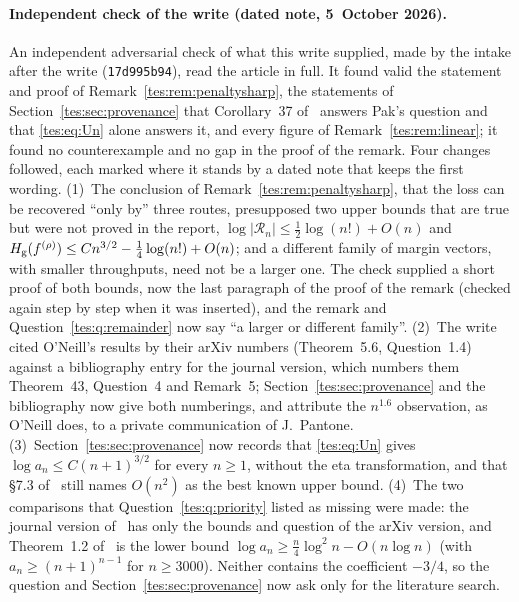 \documentclass[11pt,a4paper]{article}
\theoremstyle{remark}\newtheorem{remark}[theorem]{Remark}
\newcommand{\Hg}{H_{\rm g}}\newcommand{\floor}[1]{\left\lfloor#1\right\rfloor}
\numberwithin{equation}{section}
\begin{document}
\paragraph{Independent check of the write (dated note, 5~October 2026).}
An independent adversarial check of what this write supplied, made by the
intake after the write (\nolinkurl{17d995b94}), read the article in full.
It found valid the statement and proof of
Remark~\ref{tes:rem:penaltysharp}, the statements of
Section~\ref{tes:sec:provenance} that Corollary~37 of~\cite{bbm} answers
Pak's question and that \eqref{tes:eq:Un} alone answers it, and every
figure of Remark~\ref{tes:rem:linear}; it found no counterexample and no
gap in the proof of the remark. Four changes followed, each marked where it
stands by a dated note that keeps the first wording. (1)~The conclusion of
Remark~\ref{tes:rem:penaltysharp}, that the loss can be recovered ``only
by'' three routes, presupposed two upper bounds that are true but were not
proved in the report, $\log|\mathcal R_n|\le\frac12\log(n!)+O(n)$ and
$\Hg(f^{(\rho)})\le Cn^{3/2}-\frac14\log(n!)+O(n)$; and a different family
of margin vectors, with smaller throughputs, need not be a larger one. The
check supplied a short proof of both bounds, now the last paragraph of the
proof of the remark (checked again step by step when it was inserted), and
the remark and Question~\ref{tes:q:remainder} now say ``a larger or
different family''. (2)~The write cited O'Neill's results by their arXiv
numbers (Theorem~5.6, Question~1.4) against a bibliography entry for the
journal version, which numbers them Theorem~43, Question~4 and Remark~5;
Section~\ref{tes:sec:provenance} and the bibliography now give both
numberings, and attribute the $n^{1.6}$ observation, as O'Neill does, to a
private communication of J.~Pantone. (3)~Section~\ref{tes:sec:provenance}
now records that \eqref{tes:eq:Un} gives $\log a_n\le C(n+1)^{3/2}$ for
every $n\ge1$, without the eta transformation, and that \S7.3 of~\cite{lm}
still names $O(n^2)$ as the best known upper bound. (4)~The two comparisons
that Question~\ref{tes:q:priority} listed as missing were made: the journal
version of~\cite{oneill} has only the bounds and question of the arXiv
version, and Theorem~1.2 of~\cite{lm} is the lower bound
$\log a_n\ge\frac n4\log^2n-O(n\log n)$ (with $a_n\ge(n+1)^{n-1}$ for
$n\ge3000$). Neither contains the coefficient $-3/4$, so the question and
Section~\ref{tes:sec:provenance} now ask only for the literature search.
\end{document}

